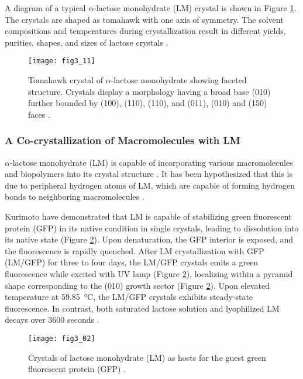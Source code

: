 \begin{refsection}
A diagram of a typical $\alpha$-lactose monohydrate (LM) crystal is shown in
Figure \ref{fig:lm-crystal}. The crystals are shaped as tomahawk with one
axis of symmetry. The solvent compositions and temperatures during
crystallization result in different yields, purities, shapes, and sizes of
lactose crystals \cite{Hourigan2013}.
\begin{figure}[htbp] \centering \texttt{[image: fig3\_11]}
    \caption[Tomahawk crystal of $\alpha$-lactose monohydrate showing faceted
        structure. Crystals display a morphology having a broad base (010)
        further bounded by (100), (110), (110), and (011), (010) and (150)
    faces.] {Tomahawk crystal of $\alpha$-lactose monohydrate showing faceted
        structure. Crystals display a morphology having a broad base (010)
        further bounded by (100), (110), (110), and (011), (010) and (150)
        faces \cite{Kurimoto1999,Wong2014}.} 
    \label{fig:lm-crystal} 
\end{figure}

\subsubsection{A Co-crystallization of Macromolecules with LM}

$\alpha$-lactose monohydrate (LM) is capable of incorporating various
macromolecules and biopolymers into its crystal structure
\cite{Wang2001a,Kurimoto1999}. It has been
hypothesized that this is due to peripheral hydrogen atoms of LM, which are
capable of forming hydrogen bonds to neighboring macromolecules
\cite{Kurimoto1999,Aizenberg1994}.

Kurimoto  have demonstrated that LM is capable of stabilizing
green fluorescent protein (GFP) in its native condition in single crystals,
leading to dissolution into its native state \cite{Kurimoto1999} (Figure
\ref{fig:lm-intro}).  Upon denaturation, the GFP interior is exposed, and the
fluorescence is rapidly quenched. After LM crystallization with GFP (LM/GFP)
for three to four days, the LM/GFP crystals emits a green fluorescence while
excited with UV lamp (Figure \ref{fig:lm-intro}), localizing within a pyramid
shape corresponding to the (010) growth sector \cite{Kurimoto1999} (Figure
\ref{fig:lm-intro}). Upon elevated temperature at
\SI{59.85}{\celsius}, the LM/GFP crystals exhibits steady-state fluorescence.
In contrast, both saturated lactose solution and lyophilized LM decays
over 3600 seconds \cite{Kurimoto1999}.
\begin{figure}[htbp] \centering \texttt{[image: fig3\_02]}
    \caption[Crystals of lactose monohydrate (LM) as hosts for the guest green
    fluorescent protein (GFP)]{Crystals of lactose monohydrate (LM) as hosts
        for the guest green fluorescent protein (GFP) \cite{Wang2001a}.}
    \label{fig:lm-intro}
\end{figure}


\end{refsection}

